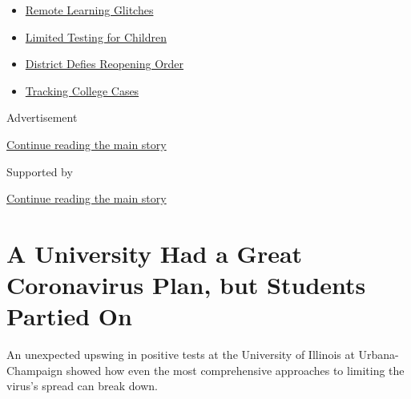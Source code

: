 \begin{itemize}
\tightlist
\item
  \href{https://www.nytimes3xbfgragh.onion/2020/09/08/us/school-districts-cyberattacks-glitches.html?name=styln-coronavirus-schools-reopening\&region=TOP_BANNER\&block=storyline_menu_recirc\&action=click\&pgtype=Article\&impression_id=82c9b0b1-f4b7-11ea-b564-bd1dfc5ec362\&variant=undefined}{Remote
  Learning Glitches}
\item
  \href{https://www.nytimes3xbfgragh.onion/2020/09/08/upshot/children-testing-shortfalls-virus.html?name=styln-coronavirus-schools-reopening\&region=TOP_BANNER\&block=storyline_menu_recirc\&action=click\&pgtype=Article\&impression_id=82c9b0b2-f4b7-11ea-b564-bd1dfc5ec362\&variant=undefined}{Limited
  Testing for Children}
\item
  \href{https://www.nytimes3xbfgragh.onion/2020/09/10/us/des-moines-school-opening-coronavirus.html?name=styln-coronavirus-schools-reopening\&region=TOP_BANNER\&block=storyline_menu_recirc\&action=click\&pgtype=Article\&impression_id=82c9b0b3-f4b7-11ea-b564-bd1dfc5ec362\&variant=undefined}{District
  Defies Reopening Order}
\item
  \href{https://www.nytimes3xbfgragh.onion/interactive/2020/us/covid-college-cases-tracker.html?name=styln-coronavirus-schools-reopening\&region=TOP_BANNER\&block=storyline_menu_recirc\&action=click\&pgtype=Article\&impression_id=82c9b0b4-f4b7-11ea-b564-bd1dfc5ec362\&variant=undefined}{Tracking
  College Cases}
\end{itemize}

Advertisement

\protect\hyperlink{after-top}{Continue reading the main story}

Supported by

\protect\hyperlink{after-sponsor}{Continue reading the main story}

\hypertarget{a-university-had-a-great-coronavirus-plan-but-students-partied-on}{%
\section{A University Had a Great Coronavirus Plan, but Students Partied
On}\label{a-university-had-a-great-coronavirus-plan-but-students-partied-on}}

An unexpected upswing in positive tests at the University of Illinois at
Urbana-Champaign showed how even the most comprehensive approaches to
limiting the virus's spread can break down.

